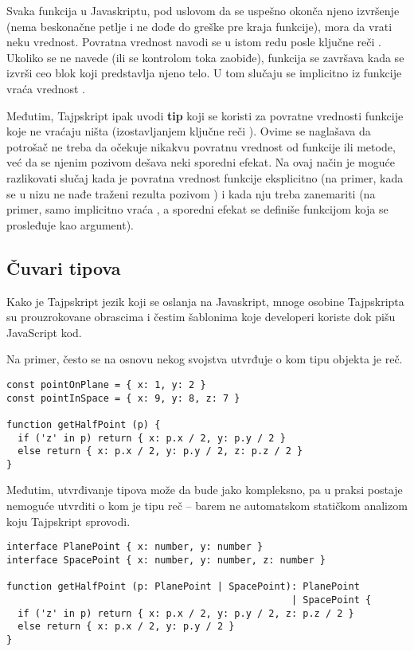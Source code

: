 Svaka funkcija u Javaskriptu, pod uslovom da se uspešno okonča njeno izvršenje (nema beskonačne petlje i ne dođe do greške pre kraja funkcije), mora da vrati neku vrednost.
Povratna vrednost navodi se u istom redu posle ključne reči .
Ukoliko se  ne navede (ili se kontrolom toka zaobiđe), funkcija se završava kada se izvrši ceo blok koji predstavlja njeno telo.
U tom slučaju se implicitno iz funkcije vraća vrednost .

Međutim, Tajpskript ipak uvodi \textbf{tip } koji se koristi za povratne vrednosti funkcije koje ne vraćaju ništa (izostavljanjem ključne reči ).
Ovime se naglašava da potrošač ne treba da očekuje nikakvu povratnu vrednost od funkcije ili metode, već da se njenim pozivom dešava neki sporedni efekat.
Na ovaj način je moguće razlikovati slučaj kada je povratna vrednost funkcije eksplicitno  (na primer, kada se u nizu ne nađe traženi rezulta pozivom ) i kada nju treba zanemariti (na primer,  samo implicitno vraća , a sporedni efekat se definiše funkcijom koja se prosleđuje kao argument).

\subsection{Čuvari tipova}

Kako je Tajpskript jezik koji se oslanja na Javaskript, mnoge osobine Tajpskripta su prouzrokovane obrascima i čestim šablonima koje developeri koriste dok pišu JavaScript kod.

Na primer, često se na osnovu nekog svojstva utvrđuje o kom tipu objekta je reč.

\begin{verbatim}
const pointOnPlane = { x: 1, y: 2 }
const pointInSpace = { x: 9, y: 8, z: 7 }

function getHalfPoint (p) {
  if ('z' in p) return { x: p.x / 2, y: p.y / 2 }
  else return { x: p.x / 2, y: p.y / 2, z: p.z / 2 }
}
\end{verbatim}

Međutim, utvrđivanje tipova može da bude jako kompleksno, pa u praksi postaje nemoguće utvrditi o kom je tipu reč -- barem ne automatskom statičkom analizom koju Tajpskript sprovodi.

\begin{verbatim}
interface PlanePoint { x: number, y: number }
interface SpacePoint { x: number, y: number, z: number }

function getHalfPoint (p: PlanePoint | SpacePoint): PlanePoint
                                                  | SpacePoint {
  if ('z' in p) return { x: p.x / 2, y: p.y / 2, z: p.z / 2 }
  else return { x: p.x / 2, y: p.y / 2 }
}
\end{verbatim}

